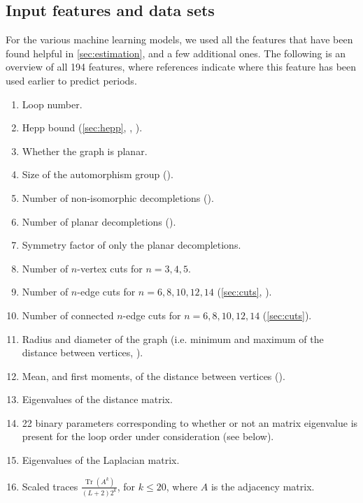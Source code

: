 \documentclass[11pt]{scrartcl}
\numberwithin{equation}{section}
\begin{document}
\subsection{Input features and data sets}\label{sec:features}
For the various machine learning models, we used all the features that have been found helpful in \cref{sec:estimation}, and a few additional ones. The following is an overview of all 194 features, where references indicate where this feature has been used earlier to predict periods.
\begin{enumerate}
	\item Loop number.
    \item Hepp bound (\cref{sec:hepp}, \cite[Sec. 6.5]{balduf_statistics_2023}, \cite{panzer_hepp_2022,kompaniets_minimally_2017}).
    \item Whether the graph is planar.
    \item Size of the automorphism group (\cite[Sec. 6.1]{balduf_statistics_2023}).
    \item Number of non-isomorphic decompletions (\cite[Sec. 6.1]{balduf_statistics_2023}).
    \item Number of planar decompletions (\cite[Sec. 6.1] {balduf_statistics_2023}).
    \item Symmetry factor of only the planar decompletions. 
    \item Number of $n$-vertex cuts for $n = 3, 4, 5$.
    \item Number of $n$-edge cuts for $n = 6, 8, 10, 12, 14$ (\cref{sec:cuts}, \cite[Sec. 6.4]{balduf_statistics_2023}).
    \item Number of connected $n$-edge cuts for $n = 6, 8, 10, 12, 14$ (\cref{sec:cuts}).
    \item Radius and diameter of the graph (i.e. minimum and maximum of the distance between vertices, \cite[Sec. 6.2]{balduf_statistics_2023}).
    \item Mean, and first moments, of the distance between vertices (\cite[Sec. 6.2]{balduf_statistics_2023}).
    \item  Eigenvalues of the distance matrix.
    \item 22 binary parameters corresponding to whether or not an matrix eigenvalue is present for the loop order under consideration (see below).
    \item Eigenvalues of the Laplacian matrix.
    \item Scaled traces $ \frac{\operatorname{Tr}(A^k)}{(L+2) 2^k} $, for $k\leq 20$, where $A$ is the adjacency matrix.

\end{enumerate}
\end{document}
